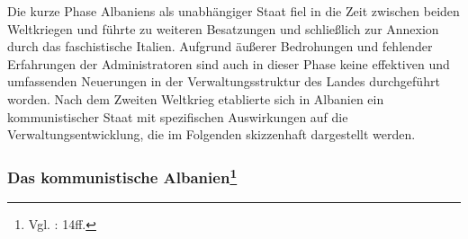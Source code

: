 Die kurze Phase Albaniens als unabhängiger Staat fiel in die Zeit zwischen beiden Weltkriegen und führte zu weiteren Besatzungen und schließlich zur Annexion durch das faschistische Italien. Aufgrund äußerer Bedrohungen und fehlender Erfahrungen der Administratoren sind auch in dieser Phase keine effektiven und umfassenden Neuerungen in der Verwaltungsstruktur des Landes durchgeführt worden. Nach dem Zweiten Weltkrieg etablierte sich in Albanien ein kommunistischer Staat mit spezifischen Auswirkungen auf die Verwaltungsentwicklung, die im Folgenden skizzenhaft dargestellt werden.
\subsubsection[Das kommunistische Albanien]{Das kommunistische Albanien\footnote{Vgl. \cite{vollmer07} : 14ff.}}

